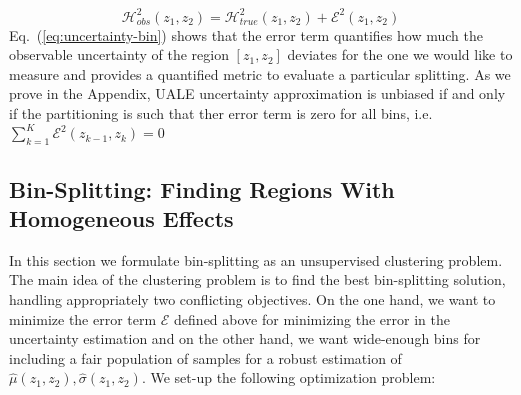 \documentclass[twoside]{article}
\begin{document}
\begin{equation}
  \label{eq:uncertainty-bin}
  \mathcal{H}^2_{obs}(z_1, z_2) = \mathcal{H}^2_{true}(z_1, z_2) + \mathcal{E}^2(z_1, z_2)
\end{equation}
%
Eq.~(\ref{eq:uncertainty-bin}) shows that the error term quantifies
how much the observable uncertainty of the region \([z_1, z_2]\)
deviates for the one we would like to measure and provides a
quantified metric to evaluate a particular splitting. As we prove in
the Appendix, UALE uncertainty approximation is unbiased if and only if the
partitioning is such that ther error term is zero for all bins, i.e. 
\(\sum_{k=1}^K \mathcal{E}^2(z_{k-1}, z_{k}) = 0\)

\subsection{Bin-Splitting: Finding Regions With Homogeneous Effects}
\label{sec:interval-spliting}

In this section we formulate bin-splitting as an unsupervised
clustering problem. The main idea of the clustering problem is to find
the best bin-splitting solution, handling appropriately two
conflicting objectives. On the one hand, we want to minimize the error
term \(\mathcal{E}\) defined above for minimizing the error in the
uncertainty estimation and on the other hand, we want wide-enough bins
for including a fair population of samples for a robust estimation of
\(\hat{\mu}(z_1, z_2), \hat{\sigma}(z_1, z_2)\). We set-up the
following optimization problem:
\end{document}
